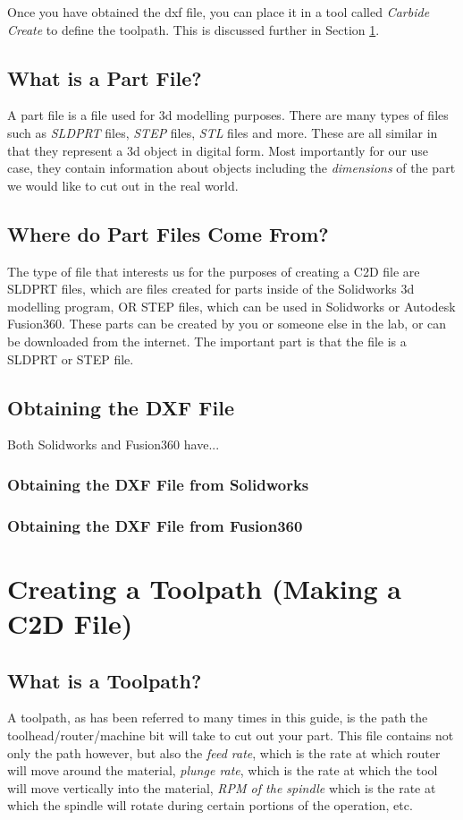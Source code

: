 \documentclass{article}
\begin{document}
Once you have obtained the dxf file, you can place it in a tool called \textit{Carbide Create} to define the toolpath. This is discussed further 
in Section \ref{sec:create-toolpath}.

\subsection{What is a Part File?}
A part file is a file used for 3d modelling purposes. There are many types of files such as \textit{SLDPRT} files, \textit{STEP} files, \textit{STL} files
and more. These are all similar in that they represent a 3d object in digital form. Most importantly for our use case, they contain information about 
objects including the \textit{dimensions} of the part we would like to cut out in the real world. 

\subsection{Where do Part Files Come From?}
The type of file that interests us for the purposes of creating a C2D file are SLDPRT files, which are files created for parts inside of the 
Solidworks 3d modelling program, OR STEP files, which can be used in Solidworks or Autodesk Fusion360. These parts can be created by you or someone 
else in the lab, or can be downloaded from the internet. The important part is that the file is a SLDPRT or STEP file.


\subsection{Obtaining the DXF File}
Both Solidworks and Fusion360 have... 

\subsubsection{Obtaining the DXF File from Solidworks}

\subsubsection{Obtaining the DXF File from Fusion360}


\section{Creating a Toolpath (Making a C2D File)}
\label{sec:create-toolpath}

\subsection{What is a Toolpath?}
A toolpath, as has been referred to many times in this guide, is the path the toolhead/router/machine bit will take to cut out your part. This file 
contains not only the path however, but also the \textit{feed rate}, which is the rate at which router will move around the material, 
\textit{plunge rate}, which is the rate at which the tool will move vertically into the material, 
\textit{RPM of the spindle} which is the rate at which the spindle will rotate during certain portions of the operation, etc. 
\end{document}
